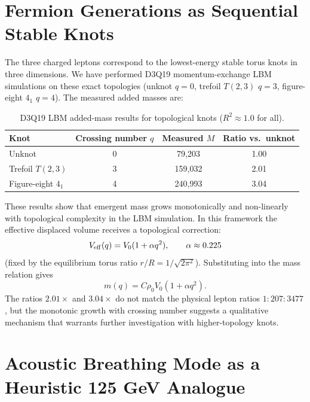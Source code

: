\documentclass[reprint,amsmath,amssymb,aps,prl,superscriptaddress]{revtex4-2}
\begin{document}
\section{Fermion Generations as Sequential Stable Knots}
\label{sec:generations}

The three charged leptons correspond to the lowest-energy stable torus knots in three dimensions. We have performed D3Q19 momentum-exchange LBM simulations on these exact topologies (unknot $q=0$, trefoil $T(2,3)$ $q=3$, figure-eight $4_1$ $q=4$). The measured added masses are:

\begin{table}[h]
\centering
\caption{D3Q19 LBM added-mass results for topological knots ($R^2\approx1.0$ for all).}
\begin{tabular}{l c c c}
\toprule
\textbf{Knot} & \textbf{Crossing number $q$} & \textbf{Measured $M$} & \textbf{Ratio vs.\ unknot} \\
\midrule
Unknot & 0 & 79,203 & 1.00 \\
Trefoil $T(2,3)$ & 3 & 159,032 & 2.01 \\
Figure-eight $4_1$ & 4 & 240,993 & 3.04 \\
\bottomrule
\end{tabular}
\end{table}

These results show that emergent mass grows monotonically and non-linearly with topological complexity in the LBM simulation. In this framework the effective displaced volume receives a topological correction:
\[
V_{\rm eff}(q)=V_0(1+\alpha q^2),\qquad\alpha\approx0.225
\]
(fixed by the equilibrium torus ratio $r/R=1/\sqrt{2\pi^2}$). Substituting into the mass relation gives
\[
m(q)=C\rho_0 V_0(1+\alpha q^2).
\]
The ratios $2.01\times$ and $3.04\times$ do not match the physical lepton ratios $1:207:3477$, but the monotonic growth with crossing number suggests a qualitative mechanism that warrants further investigation with higher-topology knots.

\section{Acoustic Breathing Mode as a Heuristic 125 GeV Analogue}
\label{sec:higgs}
\end{document}
